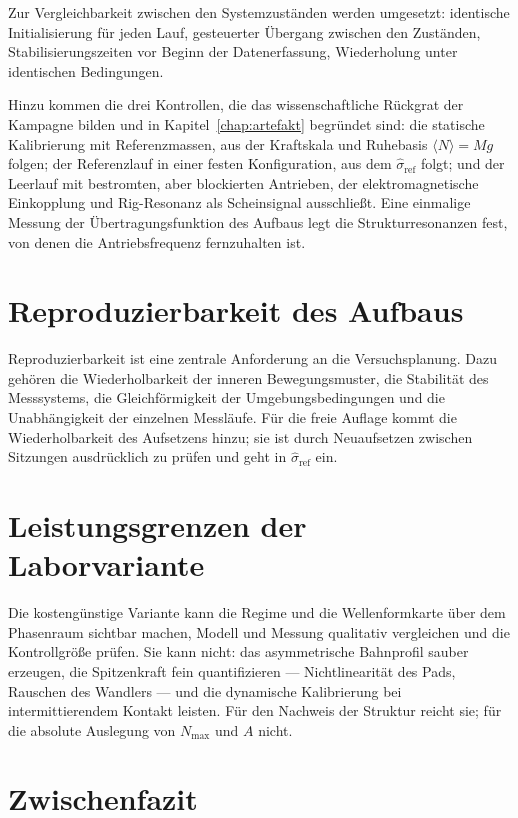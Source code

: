 \documentclass[12pt,a4paper]{report}
\begin{document}
Zur Vergleichbarkeit zwischen den Systemzuständen werden umgesetzt:
identische Initialisierung für jeden Lauf, gesteuerter Übergang zwischen
den Zuständen, Stabilisierungszeiten vor Beginn der Datenerfassung,
Wiederholung unter identischen Bedingungen.

Hinzu kommen die drei Kontrollen, die das wissenschaftliche Rückgrat der
Kampagne bilden und in Kapitel~\ref{chap:artefakt} begründet sind: die
statische Kalibrierung mit Referenzmassen, aus der Kraftskala und
Ruhebasis $\langle N \rangle = Mg$ folgen; der Referenzlauf in einer
festen Konfiguration, aus dem $\hat{\sigma}_{\mathrm{ref}}$ folgt; und
der Leerlauf mit bestromten, aber blockierten Antrieben, der
elektromagnetische Einkopplung und Rig-Resonanz als Scheinsignal
ausschließt. Eine einmalige Messung der Übertragungsfunktion des Aufbaus
legt die Strukturresonanzen fest, von denen die Antriebsfrequenz
fernzuhalten ist.

\section{Reproduzierbarkeit des Aufbaus}

Reproduzierbarkeit ist eine zentrale Anforderung an die Versuchsplanung.
Dazu gehören die Wiederholbarkeit der inneren Bewegungsmuster, die
Stabilität des Messsystems, die Gleichförmigkeit der
Umgebungsbedingungen und die Unabhängigkeit der einzelnen Messläufe.
Für die freie Auflage kommt die Wiederholbarkeit des Aufsetzens hinzu;
sie ist durch Neuaufsetzen zwischen Sitzungen ausdrücklich zu prüfen und
geht in $\hat{\sigma}_{\mathrm{ref}}$ ein.

\section{Leistungsgrenzen der Laborvariante}

Die kostengünstige Variante kann die Regime und die
Wellenformkarte über dem Phasenraum sichtbar machen, Modell und Messung
qualitativ vergleichen und die Kontrollgröße prüfen. Sie kann nicht:
das asymmetrische Bahnprofil sauber erzeugen, die Spitzenkraft fein
quantifizieren --- Nichtlinearität des Pads, Rauschen des Wandlers ---
und die dynamische Kalibrierung bei intermittierendem Kontakt leisten.
Für den Nachweis der Struktur reicht sie; für die absolute Auslegung von
$N_{\max}$ und $A$ nicht.

\section{Zwischenfazit}
\end{document}
